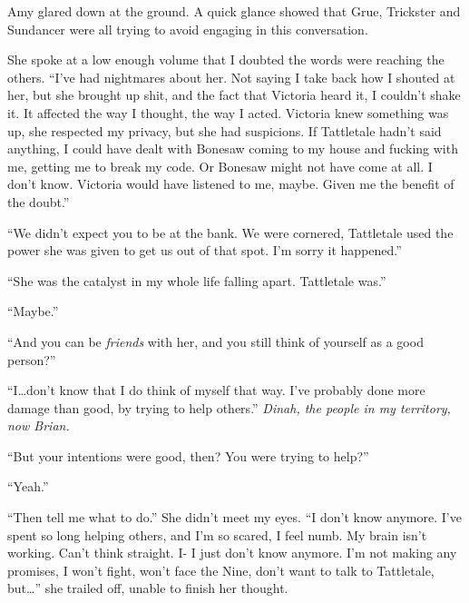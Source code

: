 Amy glared down at the ground.  A quick glance showed that Grue, Trickster and Sundancer were all trying to avoid engaging in this conversation.



She spoke at a low enough volume that I doubted the words were reaching the others.  ``I've had nightmares about her.  Not saying I take back how I shouted at her, but she brought up shit, and the fact that Victoria heard it, I couldn't shake it.  It affected the way I thought, the way I acted.  Victoria knew something was up, she respected my privacy, but she had suspicions.  If Tattletale hadn't said anything, I could have dealt with Bonesaw coming to my house and fucking with me, getting me to break my code.  Or Bonesaw might not have come at all.  I don't know.  Victoria would have listened to me, maybe.  Given me the benefit of the doubt.''



``We didn't expect you to be at the bank.  We were cornered, Tattletale used the power she was given to get us out of that spot.  I'm sorry it happened.''



``She was the catalyst in my whole life falling apart.  Tattletale was.''



``Maybe.''



``And you can be \emph{friends} with her, and you still think of yourself as a good person?''



``I\ldots don't know that I do think of myself that way.  I've probably done more damage than good, by trying to help others.''  \emph{Dinah, the people in my territory, now Brian.}



``But your intentions were good, then?  You were trying to help?''



``Yeah.''



``Then tell me what to do.''  She didn't meet my eyes.  ``I don't know anymore.  I've spent so long helping others, and I'm so scared, I feel numb.  My brain isn't working.  Can't think straight.  I-  I just don't know anymore.  I'm not making any promises, I won't fight, won't face the Nine, don't want to talk to Tattletale, but\ldots'' she trailed off, unable to finish her thought.



